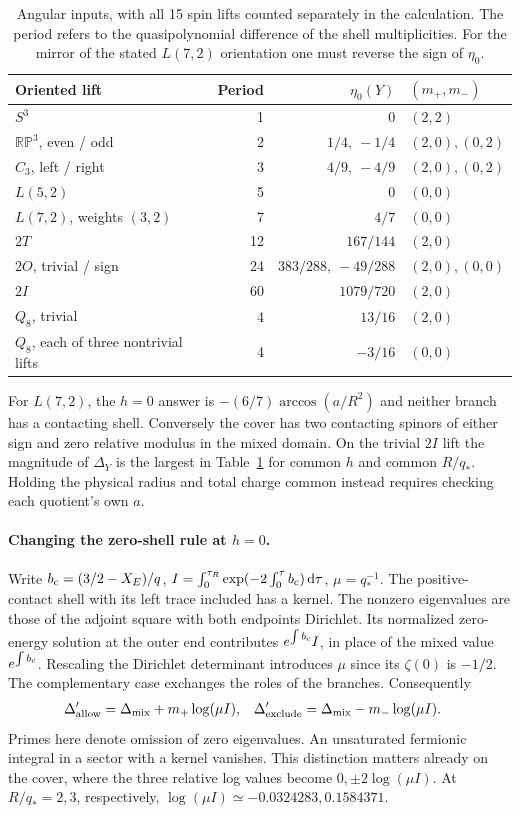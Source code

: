 \begin{table}[htbp]\centering
\begin{tabular}{lrrl}
\toprule
Oriented lift & Period & $\eta_0(Y)$ & $(m_+,m_-)$\\
\midrule
$S^3$ &1&0&$(2,2)$\\
$\mathbb{RP}^3$, even / odd &2&$1/4,\ -1/4$&$(2,0),(0,2)$\\
$C_3$, left / right &3&$4/9,\ -4/9$&$(2,0),(0,2)$\\
$L(5,2)$ &5&0&$(0,0)$\\
$L(7,2)$, weights $(3,2)$ &7&$4/7$&$(0,0)$\\
$2T$ &12&$167/144$&$(2,0)$\\
$2O$, trivial / sign &24&$383/288,\ -49/288$&$(2,0),(0,0)$\\
$2I$ &60&$1079/720$&$(2,0)$\\
$Q_8$, trivial &4&$13/16$&$(2,0)$\\
$Q_8$, each of three nontrivial lifts &4&$-3/16$&$(0,0)$\\
\bottomrule
\end{tabular}
\caption{Angular inputs, with all 15 spin lifts counted separately in the calculation. The period refers to the quasipolynomial difference of the shell multiplicities. For the mirror of the stated $L(7,2)$ orientation one must reverse the sign of $\eta_0$.}
\label{tab:eta}
\end{table}

For $L(7,2)$, the $h=0$ answer is $-(6/7)\arccos(a/R^2)$ and neither branch has a contacting shell. Conversely the cover has two contacting spinors of either sign and zero relative modulus in the mixed domain. On the trivial $2I$ lift the magnitude of $\Delta_Y$ is the largest in Table~\ref{tab:eta} for common $h$ and common $R/q_*$. Holding the physical radius and total charge common instead requires checking each quotient's own $a$.

\paragraph{Changing the zero-shell rule at $h=0$.}
Write $b_{\rm c}=(3/2-X_E)/q$, $I=\int_0^{\tau_R}\exp(-2\int_0^\tau b_{\rm c})\,\mathrm d\tau$, $\mu=q_*^{-1}$. The positive-contact shell with its left trace included has a kernel. The nonzero eigenvalues are those of the adjoint square with both endpoints Dirichlet. Its normalized zero-energy solution at the outer end contributes $e^{\int b_{\rm c}}I$, in place of the mixed value $e^{\int b_{\rm c}}$. Rescaling the Dirichlet determinant introduces $\mu$ since its $\zeta(0)$ is $-1/2$. The complementary case exchanges the roles of the branches. Consequently
\begin{align}
 \Delta_{\rm allow}'&=\Delta_{\rm mix}+m_+\log(\mu I),&
 \Delta_{\rm exclude}'&=\Delta_{\rm mix}-m_-\log(\mu I).
 \label{eq:contact}
\end{align}
Primes here denote omission of zero eigenvalues. An unsaturated fermionic integral in a sector with a kernel vanishes. This distinction matters already on the cover, where the three relative log values become $0,\pm2\log(\mu I)$. At $R/q_*=2,3$, respectively, $\log(\mu I)\simeq-0.0324283,0.1584371$.

